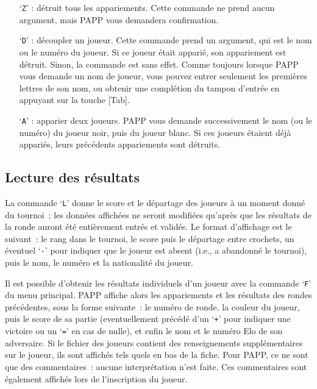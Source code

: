 \documentclass[10pt]{article}
\begin{document}
\begin{itemize}

	\item[`{\tt Z}' :] détruit tous les appariements. Cette commande ne
prend aucun argument, mais PAPP vous demandera confirmation.

\item[`{\tt D}' :] découpler un joueur. Cette commande prend un 
argument, qui est le nom ou le numéro du joueur.  Si ce joueur 
était apparié, son appariement est détruit.  Sinon, la commande 
est sans effet.  Comme toujours lorsque PAPP vous demande un nom de 
joueur, vous pouvez entrer seulement les premières lettres de son 
nom, ou obtenir une complétion du tampon d'entrée en appuyant sur 
la touche [Tab].

\item[`{\tt A}' :] apparier deux joueurs.  PAPP vous demande 
successivement le nom (ou le numéro) du joueur noir, puis du joueur 
blanc.  Si ces joueurs étaient déjà appariés, leurs 
précédents appariements sont détruits.

\end{itemize}

\subsection{Lecture des résultats}

	La commande `\verb|L|' donne le score et le départage des
joueurs à un moment donné du tournoi~; les données affichées ne
seront modifiées qu'après que les résultats de la ronde auront
été entièrement entrés et validés.  Le format d'affichage est
le suivant~: le rang dans le tournoi, le score puis le départage entre
crochets, un éventuel `\verb|-|' pour indiquer que le joueur est
absent (i.e., a abandonné le tournoi), puis le nom, le numéro et la
nationalité du joueur.

Il est possible d'obtenir les résultats individuels d'un joueur avec 
la commande `\verb|F|' du menu principal.  PAPP affiche alors les 
appariements et les résultats des rondes précédentes, sous la 
forme suivante~: le numéro de ronde, la couleur du joueur, puis le 
score de sa partie (eventuellement précédé d'un `\verb|+|' pour 
indiquer une victoire ou un `\verb|=|' en cas de nulle), et enfin le 
nom et le numéro Elo de son adversaire.  Si le fichier des joueurs 
contient des renseignements supplémentaires sur le joueur, ils sont 
affichés tels quels en bas de la fiche.  Pour PAPP, ce ne sont que 
des commentaires~: aucune interprétation n'est faite.  Ces 
commentaires sont également affichés lors de l'inscription du 
joueur.
\end{document}
